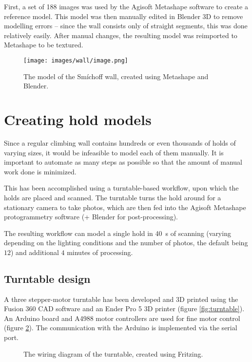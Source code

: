 First, a set of 188 images was used by the Agisoft Metashape software to create a reference model.
This model was then manually edited in Blender 3D to remove modelling errors -- since the wall consists only of straight segments, this was done relatively easily.
After manual changes, the resulting model was reimported to Metashape to be textured.

\begin{figure}[t]
	\centering
	\texttt{[image: images/wall/image.png]}
	\caption{The model of the Smíchoff wall, created using Metashape and Blender.}
	\label{fig:model}
\end{figure}


\section{Creating hold models}
Since a regular climbing wall contains hundreds or even thousands of holds of varying sizes, it would be infeasible to model each of them manually.
It is important to automate as many steps as possible so that the amount of manual work done is minimized.

This has been accomplished using a turntable-based workflow, upon which the holds are placed and scanned.
The turntable turns the hold around for a stationary camera to take photos, which are then fed into the Agisoft Metashape protogrammetry software (+ Blender for post-processing).

The resulting workflow can model a single hold in \SI{40}{\second} of scanning (varying depending on the lighting conditions and the number of photos, the default being $12$) and additional $4$ minutes of processing.

\subsection{Turntable design}
A three stepper-motor turntable has been developed and 3D printed using the Fusion 360 CAD software and an Ender Pro 5 3D printer (figure \ref{fig:turntable}).
An Arduino board and A4988 motor controllers are used for fine motor control (figure \ref{fig:wiring}).
The communication with the Arduino is implemented via the serial port.

\begin{figure}
	\centering
	
	\caption{The wiring diagram of the turntable, created using Fritzing.}
	\label{fig:wiring}
\end{figure}

